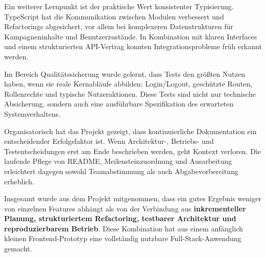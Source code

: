 Ein weiterer Lernpunkt ist der praktische Wert konsistenter Typisierung.
TypeScript hat die Kommunikation zwischen Modulen verbessert und Refactorings
abgesichert, vor allem bei komplexeren Datenstrukturen für Kampagneninhalte und
Benutzerzustände.
In Kombination mit klaren Interfaces und einem strukturierten API-Vertrag
konnten Integrationsprobleme früh erkannt werden.

Im Bereich Qualitätssicherung wurde gelernt, dass Tests den größten Nutzen
haben, wenn sie reale Kernabläufe abbilden:
Login/Logout, geschützte Routen, Rollenrechte und typische Nutzeraktionen.
Diese Tests sind nicht nur technische Absicherung, sondern auch eine
ausführbare Spezifikation des erwarteten Systemverhaltens.

Organisatorisch hat das Projekt gezeigt, dass kontinuierliche Dokumentation ein
entscheidender Erfolgsfaktor ist.
Wenn Architektur-, Betriebs- und Testentscheidungen erst am Ende beschrieben
werden, geht Kontext verloren.
Die laufende Pflege von README, Meilensteinzuordnung und Ausarbeitung erleichtert
dagegen sowohl Teamabstimmung als auch Abgabevorbereitung erheblich.

Insgesamt wurde aus dem Projekt mitgenommen, dass ein gutes Ergebnis weniger von
einzelnen Features abhängt als von der Verbindung aus
\textbf{inkrementeller Planung, strukturiertem Refactoring, testbarer
Architektur und reproduzierbarem Betrieb}.
Diese Kombination hat aus einem anfänglich kleinen Frontend-Prototyp eine
vollständig nutzbare Full-Stack-Anwendung gemacht.
